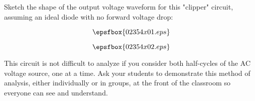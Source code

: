 

Sketch the shape of the output voltage waveform for this "clipper" circuit, assuming an ideal diode with no forward voltage drop:

$$\epsfbox{02354x01.eps}$$







$$\epsfbox{02354x02.eps}$$







This circuit is not difficult to analyze if you consider both half-cycles of the AC voltage source, one at a time.  Ask your students to demonstrate this method of analysis, either individually or in groups, at the front of the classroom so everyone can see and understand.




